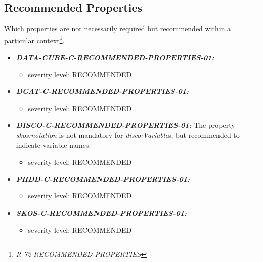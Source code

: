 \documentclass{llncs}
\begin{document}
\subsection{Recommended Properties}

Which properties are not necessarily required but recommended within a particular context\footnote{{\em R-72-RECOMMENDED-PROPERTIES}}.

\begin{itemize}
	\item \textbf{{\em DATA-CUBE-C-RECOMMENDED-PROPERTIES-01:}}
	\begin{itemize}
		\item severity level: RECOMMENDED
	\end{itemize}
\end{itemize}

\begin{itemize}
	\item \textbf{{\em DCAT-C-RECOMMENDED-PROPERTIES-01:}}
	\begin{itemize}
		\item severity level: RECOMMENDED
	\end{itemize}
\end{itemize}

\begin{itemize}
	\item \textbf{{\em DISCO-C-RECOMMENDED-PROPERTIES-01:}}
  The property {\em skos:notation} is not mandatory for {\em disco:Variable}s, but recommended to indicate variable names.
	\begin{itemize}
		\item severity level: RECOMMENDED
	\end{itemize}
\end{itemize}

\begin{itemize}
	\item \textbf{{\em PHDD-C-RECOMMENDED-PROPERTIES-01:}}
	\begin{itemize}
		\item severity level: RECOMMENDED
	\end{itemize}
\end{itemize}

\begin{itemize}
	\item \textbf{{\em SKOS-C-RECOMMENDED-PROPERTIES-01:}}
	\begin{itemize}
		\item severity level: RECOMMENDED
	\end{itemize}
\end{itemize}
\end{document}
